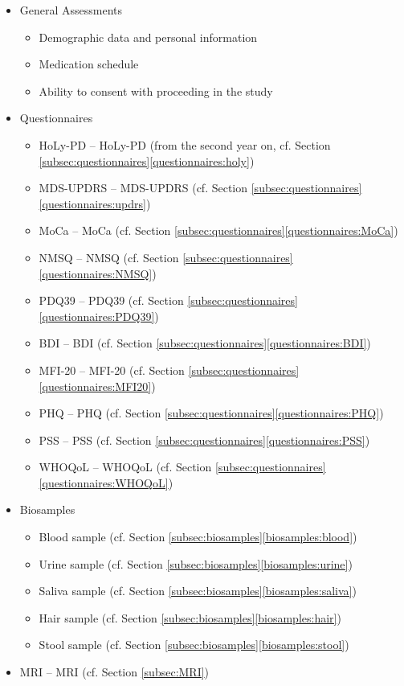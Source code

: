 \begin{itemize}[noitemsep,topsep=0pt]
\item General Assessments
\begin{itemize}[noitemsep,topsep=0pt]
\item Demographic data and personal information
\item Medication schedule
\item Ability to consent with proceeding in the study
\end{itemize}
\item Questionnaires
\begin{itemize}[noitemsep,topsep=0pt]
\item \acl{HoLy-PD} -- \acs{HoLy-PD} (from the second year on, cf. Section \ref{subsec:questionnaires}\ref{questionnaires:holy})
\item \acl{MDS-UPDRS} -- \acs{MDS-UPDRS} (cf. Section \ref{subsec:questionnaires}\ref{questionnaires:updrs})
\item \acl{MoCa} -- \acs{MoCa} (cf. Section \ref{subsec:questionnaires}\ref{questionnaires:MoCa})
\item \acl{NMSQ} -- \acs{NMSQ} (cf. Section \ref{subsec:questionnaires}\ref{questionnaires:NMSQ})
\item \acl{PDQ39} -- \acs{PDQ39} (cf. Section \ref{subsec:questionnaires}\ref{questionnaires:PDQ39})
\item \acl{BDI} -- \acs{BDI} (cf. Section \ref{subsec:questionnaires}\ref{questionnaires:BDI})
\item \acl{MFI-20} -- \acs{MFI-20} (cf. Section \ref{subsec:questionnaires}\ref{questionnaires:MFI20})
\item \acl{PHQ} -- \acs{PHQ} (cf. Section \ref{subsec:questionnaires}\ref{questionnaires:PHQ})
\item \acl{PSS} -- \acs{PSS} (cf. Section \ref{subsec:questionnaires}\ref{questionnaires:PSS})
\item \acl{WHOQoL} -- \acs{WHOQoL} (cf. Section \ref{subsec:questionnaires}\ref{questionnaires:WHOQoL})
\end{itemize}
\item Biosamples
\begin{itemize}[noitemsep,topsep=0pt]
\item Blood sample (cf. Section \ref{subsec:biosamples}\ref{biosamples:blood})
\item Urine sample (cf. Section \ref{subsec:biosamples}\ref{biosamples:urine})
\item Saliva sample (cf. Section \ref{subsec:biosamples}\ref{biosamples:saliva})
\item Hair sample (cf. Section \ref{subsec:biosamples}\ref{biosamples:hair})
\item Stool sample (cf. Section \ref{subsec:biosamples}\ref{biosamples:stool})
\end{itemize}
\item \acl{MRI} -- \acs{MRI} (cf. Section \ref{subsec:MRI}) 
\end{itemize}

